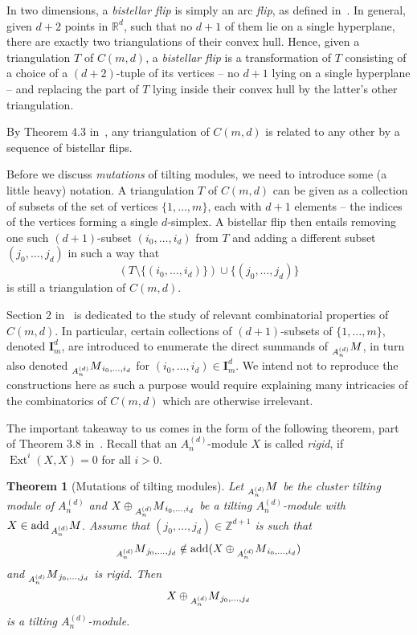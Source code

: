 \documentclass[a4paper,oneside,svgnames]{amsart}
\theoremstyle{plain}
\newtheorem{theorem}{Theorem}[section]
\theoremstyle{definition}
\DeclareMathOperator{\ext}{Ext}
\DeclareMathOperator{\add}{add}
\begin{document}
 In two dimensions, a \emph{bistellar flip} is simply an arc \emph{flip}, as
 defined in~. In general, given $d+2$ points in $\mathbb{R}^{d}$,
 such that no $d+1$ of them lie on a single hyperplane, there are exactly two
 triangulations of their convex hull. Hence, given a triangulation $T$ of
 $C(m,d)$, a \emph{bistellar flip} is a transformation of $T$ consisting of a
 choice of a $(d+2)$-tuple of its vertices -- no $d+1$ lying on a single
 hyperplane -- and replacing the part of $T$ lying inside their convex hull by
 the latter's other triangulation.

 By Theorem 4.3 in~\cite{ot}, any triangulation of $C(m,d)$ is related to any
 other by a sequence of bistellar flips.

 Before we discuss \emph{mutations} of tilting modules, we need to introduce
 some (a little heavy) notation. A triangulation $T$ of $C(m,d)$ can be given as
 a collection of subsets of the set of vertices $\{1,\ldots,m\}$, each with
 $d+1$ elements -- the indices of the vertices forming a single $d$-simplex. A
 bistellar flip then entails removing one such $(d+1)$-subset $(i_0,\ldots,i_d)$
 from $T$ and adding a different subset $(j_0,\ldots,j_d)$ in such a way that
 \[
  (T \setminus \{(i_0,\ldots,i_d)\}) \cup \{(j_0,\ldots,j_d)\}
 \]
 is still a triangulation of $C(m,d)$.

 Section 2 in~\cite{ot} is dedicated to the study of relevant combinatorial
 properties of $C(m,d)$. In particular, certain collections of $(d+1)$-subsets
 of $\{1,\ldots,m\}$, denoted $\mathbf{I}_m^{d}$, are introduced to enumerate
 the direct summands of $\prescript{}{A_n^{(d)}}M$, in turn also denoted
 $\prescript{}{A^{(d)}_n}M_{i_0,\ldots,i_d}$ for $(i_0,\ldots,i_d) \in
 \mathbf{I}_m^{d}$. We intend not to reproduce the constructions here as such a
 purpose would require explaining many intricacies of the combinatorics of
 $C(m,d)$ which are otherwise irrelevant.

 The important takeaway to us comes in the form of the following theorem, part
 of Theorem 3.8 in~\cite{ot}. Recall that an $A^{(d)}_n$-module $X$ is called
 \emph{rigid}, if $\ext^{i}(X,X) = 0$ for all $i>0$.

 \begin{theorem}[Mutations of tilting modules]
  \label{thm:tilting-modules}
  Let $\prescript{}{A^{(d)}_n}M$ be the cluster tilting module of $A^{(d)}_n$
  and $X \oplus \prescript{}{A^{(d)}_n}M_{i_0,\ldots,i_d}$ be a tilting
  $A^{(d)}_n$-module with $X \in \add \prescript{}{A^{(d)}_n}M$. Assume that
  $(j_0,\ldots,j_d) \in \mathbb{Z}^{d+1}$ is such that
  \[
   \prescript{}{A^{(d)}_n}M_{j_0,\ldots,j_d} \notin \add (X \oplus
   \prescript{}{A^{(d)}_n}M_{i_0,\ldots,i_d})
  \]
  and $\prescript{}{A^{(d)}_n}M_{j_0,\ldots,j_d}$ is rigid. Then
  \[
   X \oplus \prescript{}{A^{(d)}_n}M_{j_0,\ldots,j_d}
  \]
  is a tilting $A^{(d)}_n$-module.
 \end{theorem}
\end{document}
